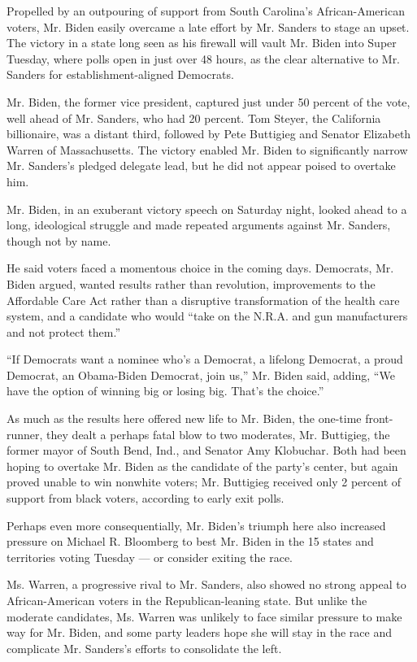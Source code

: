 Propelled by an outpouring of support from South Carolina's
African-American voters, Mr. Biden easily overcame a late effort by Mr.
Sanders to stage an upset. The victory in a state long seen as his
firewall will vault Mr. Biden into Super Tuesday, where polls open in
just over 48 hours, as the clear alternative to Mr. Sanders for
establishment-aligned Democrats.

Mr. Biden, the former vice president, captured just under 50 percent of
the vote, well ahead of Mr. Sanders, who had 20 percent. Tom Steyer, the
California billionaire, was a distant third, followed by Pete Buttigieg
and Senator Elizabeth Warren of Massachusetts. The victory enabled Mr.
Biden to significantly narrow Mr. Sanders's pledged delegate lead, but
he did not appear poised to overtake him.

Mr. Biden, in an exuberant victory speech on Saturday night, looked
ahead to a long, ideological struggle and made repeated arguments
against Mr. Sanders, though not by name.

He said voters faced a momentous choice in the coming days. Democrats,
Mr. Biden argued, wanted results rather than revolution, improvements to
the Affordable Care Act rather than a disruptive transformation of the
health care system, and a candidate who would ``take on the N.R.A. and
gun manufacturers and not protect them.''

``If Democrats want a nominee who's a Democrat, a lifelong Democrat, a
proud Democrat, an Obama-Biden Democrat, join us,'' Mr. Biden said,
adding, ``We have the option of winning big or losing big. That's the
choice.''

As much as the results here offered new life to Mr. Biden, the one-time
front-runner, they dealt a perhaps fatal blow to two moderates, Mr.
Buttigieg, the former mayor of South Bend, Ind., and Senator Amy
Klobuchar. Both had been hoping to overtake Mr. Biden as the candidate
of the party's center, but again proved unable to win nonwhite voters;
Mr. Buttigieg received only 2 percent of support from black voters,
according to early exit polls.

Perhaps even more consequentially, Mr. Biden's triumph here also
increased pressure on Michael R. Bloomberg to best Mr. Biden in the 15
states and territories voting Tuesday --- or consider exiting the race.

Ms. Warren, a progressive rival to Mr. Sanders, also showed no strong
appeal to African-American voters in the Republican-leaning state. But
unlike the moderate candidates, Ms. Warren was unlikely to face similar
pressure to make way for Mr. Biden, and some party leaders hope she will
stay in the race and complicate Mr. Sanders's efforts to consolidate the
left.

